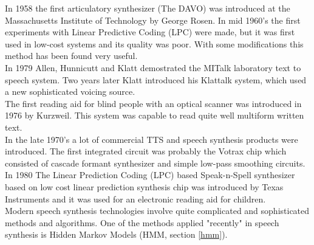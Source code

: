 In 1958 the first articulatory synthesizer (The DAVO) was introduced at the Massachusetts Institute of Technology by George Rosen. In mid 1960's the first experiments with Linear Predictive Coding (LPC) were made, but it was first used in low-cost systems and its quality was poor. With some modifications this method has been found very useful.\\
In 1979 Allen, Hunnicutt and Klatt demostrated the MITalk laboratory text to speech system. Two years later Klatt introduced his Klattalk system, which used a new sophisticated voicing source.\\
The first reading aid for blind people with an optical scanner was introduced in 1976 by Kurzweil. This system was capable to read quite well multiform written text.\\
In the late 1970's a lot of commercial TTS and speech synthesis products were introduced. The first integrated circuit was probably the Votrax chip which consisted of cascade formant synthesizer and simple low-pass smoothing circuits. In 1980 The Linear Prediction Coding (LPC) based Speak-n-Spell synthesizer based on low cost linear prediction synthesis chip was introduced by Texas Instruments and it was used for an electronic reading aid for children.\\
Modern speech synthesis technologies involve quite complicated and sophisticated methods and algorithms. One of the methods applied "recently" in speech synthesis is Hidden Markov Models (HMM, section \ref{hmm}).